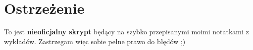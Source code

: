 \section*{Ostrzeżenie}

To jest \textbf{nieoficjalny skrypt} będący na szybko przepisanymi moimi notatkami z wykładów. Zastrzegam więc sobie pełne prawo do błędów ;)

\pagebreak